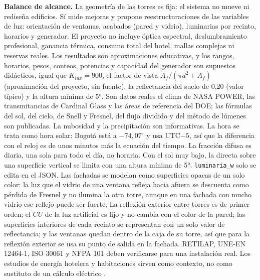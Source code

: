 \documentclass[12pt,a4paper]{article}
\newcommand{\codigo}[1]{\texttt{#1}}
\begin{document}
\textbf{Balance de alcance.} La geometría de las torres es fija: el sistema no mueve ni rediseña edificios. Sí mide mejoras y propone reestructuraciones de las variables de luz: orientación de ventanas, acabados (pared y vidrio), luminarias por recinto, horarios y generador. El proyecto no incluye óptica espectral, deslumbramiento profesional, ganancia térmica, consumo total del hotel, mallas complejas ni reservas reales. Los resultados son aproximaciones educativas, y los rangos, horarios, pesos, conteos, potencias y capacidad del generador son supuestos didácticos, igual que $K_{lux}=900$, el factor de vista $A_f/(\pi d^2+A_f)$ (aproximación del proyecto, sin fuente), la reflectancia del suelo de 0,20 (valor típico) y la altura mínima de 5°. Son datos reales el clima de NASA POWER, las transmitancias de Cardinal Glass y las áreas de referencia del DOE; las fórmulas del sol, del cielo, de Snell y Fresnel, del flujo dividido y del método de lúmenes son publicadas. La nubosidad y la precipitación son informativas. La hora se trata como hora solar: Bogotá está a $-74,07^\circ$ y usa UTC$-5$, así que la diferencia con el reloj es de unos minutos más la ecuación del tiempo. La fracción difusa es diaria, una sola para todo el día, no horaria. Con el sol muy bajo, la directa sobre una superficie vertical se limita con una altura mínima de 5°. \codigo{luminaria\_w} solo se edita en el JSON. Las fachadas se modelan como superficies opacas de un solo color: la luz que el vidrio de una ventana refleja hacia afuera se descuenta como pérdida de Fresnel y no ilumina la otra torre, aunque en una fachada con mucho vidrio ese reflejo puede ser fuerte. La reflexión exterior entre torres es de primer orden; el $CU$ de la luz artificial es fijo y no cambia con el color de la pared; las superficies interiores de cada recinto se representan con un solo valor de reflectancia; y las ventanas quedan dentro de la caja de su torre, así que para la reflexión exterior se usa su punto de salida en la fachada. RETILAP, UNE-EN 12464-1, ISO 30061 y NFPA 101 deben verificarse para una instalación real. Los estudios de energía hotelera y habitaciones sirven como contexto, no como sustituto de un cálculo eléctrico \cite{hotelReview,lbnlHotelLighting,energyStarEui}.
\end{document}
